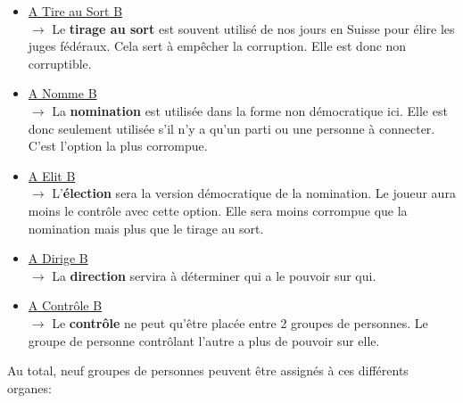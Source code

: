 \documentclass{article}
\begin{document}
                        \begin{itemize}
                            \item \underline{A Tire au Sort B}\\
                                $\rightarrow$ Le \textbf{tirage au sort} est souvent utilisé de nos jours en Suisse pour élire les juges fédéraux. Cela sert à empêcher la corruption. Elle est donc non corruptible.
                            \item \underline{A Nomme B}\\
                                $\rightarrow$ La \textbf{nomination} est utilisée dans la forme non démocratique ici. Elle est donc seulement utilisée s'il n’y a qu’un parti ou une personne à connecter. C’est l’option la plus corrompue. 
                            \item \underline{A Elit B}\\
                                $\rightarrow$ L'\textbf{élection} sera la version démocratique de la nomination. Le joueur aura moins le contrôle avec cette option. Elle sera moins corrompue que la nomination mais plus que le tirage au sort. 
                            \item \underline{A Dirige B}\\
                                $\rightarrow$ La \textbf{direction} servira à déterminer qui a le pouvoir sur qui.
                            \item \underline{A Contrôle B}\\
                                $\rightarrow$ Le \textbf{contrôle} ne peut qu'être placée entre 2 groupes de personnes. Le groupe de personne contrôlant l’autre a plus de pouvoir sur elle. 
                        \end{itemize}
                    Au total, neuf groupes de personnes peuvent être assignés à ces différents organes:
\end{document}
